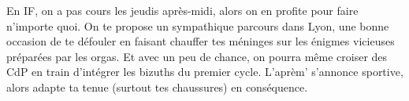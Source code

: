 En IF, on a pas cours les jeudis après-midi, alors on en profite pour faire
n'importe quoi. On te propose un sympathique parcours dans Lyon, une bonne occasion de te
défouler en faisant chauffer tes méninges sur les énigmes vicieuses préparées
par les orgas. Et avec un peu de chance, on pourra même croiser des CdP en
train d'intégrer les bizuths du premier cycle.
L'aprèm' s'annonce sportive, alors adapte ta tenue (surtout tes chaussures) en
conséquence. 
